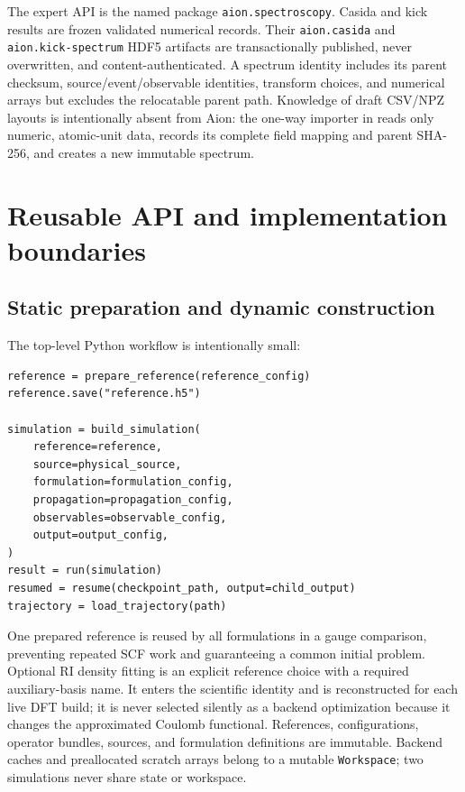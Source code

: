 \documentclass[11pt]{article}
\newcommand{\code}[1]{\texttt{#1}}
\begin{document}
The expert API is the named package \code{aion.spectroscopy}. Casida and kick
results are frozen validated numerical records. Their \code{aion.casida}
and \code{aion.kick-spectrum} HDF5 artifacts are transactionally published,
never overwritten, and content-authenticated. A spectrum identity includes
its parent checksum, source/event/observable identities, transform choices,
and numerical arrays but excludes the relocatable parent path. Knowledge of
draft CSV/NPZ layouts is intentionally absent from Aion: the one-way importer
in  reads only numeric, atomic-unit data,
records its complete field mapping and parent SHA-256, and creates a new
immutable spectrum.

\section{Reusable API and implementation boundaries}

\subsection{Static preparation and dynamic construction}

The top-level Python workflow is intentionally small:
\begin{verbatim}
reference = prepare_reference(reference_config)
reference.save("reference.h5")

simulation = build_simulation(
    reference=reference,
    source=physical_source,
    formulation=formulation_config,
    propagation=propagation_config,
    observables=observable_config,
    output=output_config,
)
result = run(simulation)
resumed = resume(checkpoint_path, output=child_output)
trajectory = load_trajectory(path)
\end{verbatim}

One prepared reference is reused by all formulations in a gauge comparison,
preventing repeated SCF work and guaranteeing a common initial problem.
Optional RI density fitting is an explicit reference choice with a required
auxiliary-basis name. It enters the scientific identity and is reconstructed
for each live DFT build; it is never selected silently as a backend
optimization because it changes the approximated Coulomb functional.
References, configurations, operator bundles, sources, and formulation
definitions are immutable. Backend caches and preallocated scratch arrays
belong to a mutable \code{Workspace}; two simulations never share state or
workspace.
\end{document}

